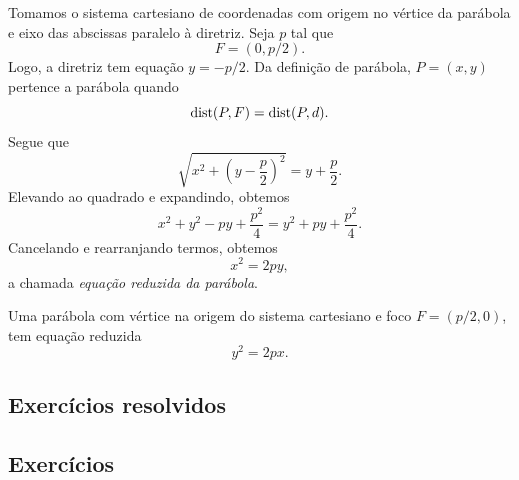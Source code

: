 Tomamos o sistema cartesiano de coordenadas com origem no vértice da parábola e eixo das abscissas paralelo à diretriz. Seja $p$ tal que
\begin{equation}
  F = (0,p/2).
\end{equation}
Logo, a diretriz tem equação $y = -p/2$. Da definição de parábola, $P=(x,y)$ pertence a parábola quando
\begin{equation}
  \operatorname{dist}(P,F) = \operatorname{dist}(P,d).
\end{equation}
Segue que
\begin{equation}
  \sqrt{x^2+\left(y-\frac{p}{2}\right)^2} = y+\frac{p}{2}.
\end{equation}
Elevando ao quadrado e expandindo, obtemos
\begin{equation}
  x^2 + y^2-py+\frac{p^2}{4} = y^2 + py + \frac{p^2}{4}.
\end{equation}
Cancelando e rearranjando termos, obtemos
\begin{equation}
  x^2 = 2py,
\end{equation}
a chamada \emph{equação reduzida da parábola}.

\begin{obs}
  Uma parábola com vértice na origem do sistema cartesiano e foco $F=(p/2, 0)$, tem equação reduzida
  \begin{equation}
    y^2 = 2px.
  \end{equation}
\end{obs}

\subsection*{Exercícios resolvidos}

\emconstrucao

\subsection*{Exercícios}

\emconstrucao